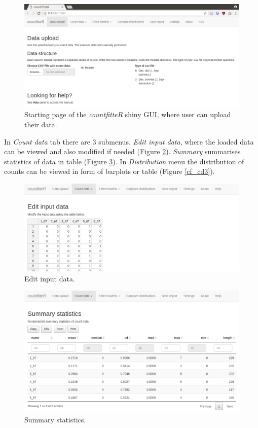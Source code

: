 \begin{figure}[htbp]
  \centering
  \includegraphics[width=0.99\columnwidth]{fig/cf_main.png}
  \caption{Starting page of the \emph{countfitteR} shiny GUI, where user can upload their data.}
    \label{cf_main}
\end{figure}

In \textit{Count data} tab there are 3 submenus. \textit{Edit input data}, where the loaded data can be viewed and also modified if needed (Figure \ref{cf_cd1}). \textit{Summary} summarises statistics of data in table (Figure \ref{cf_cd2}). In \textit{Distribution} menu the distribution of counts can be viewed in form of barplots or table (Figure \ref{cf_cd3}).

\begin{figure}[htbp]
  \centering
  \includegraphics[width=0.99\columnwidth]{fig/cf_cd1.png}
  \caption{Edit input data.}
    \label{cf_cd1}
\end{figure}

\begin{figure}[htbp]
  \centering
  \includegraphics[width=0.99\columnwidth]{fig/cf_cd2.png}
  \caption{Summary statistics.}
    \label{cf_cd2}
\end{figure}


